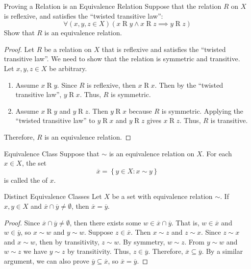 \documentclass[letterpaper,12pt]{report}
\begin{document}
\begin{exbox}{Proving a Relation is an Equivalence Relation}{}
    Suppose that the relation $R$ on $X$ is reflexive, and satisfies the ``twisted transitive law'':
    \[ \forall (x,y,z \in X) (x \mathrel{R} y \land x \mathrel{R} z \implies y \mathrel{R} z) \]
    Show that $R$ is an equivalence relation.
    \tcblower
    \begin{proof}
        Let $R$ be a relation on $X$ that is reflexive and satisfies the ``twisted transitive law''. We need to show that the relation is symmetric and transitive. Let $x,y,z \in X$ be arbitrary.
        \begin{enumerate}
            \item Assume $x \mathrel{R} y$. Since $R$ is reflexive, then $x \mathrel{R} x$. Then by the ``twisted transitive law'', $y \mathrel{R} x$. Thus, $R$ is symmetric.
            \item Assume $x \mathrel{R} y$ and $y \mathrel{R} z$. Then $y \mathrel{R} x$ because $R$ is symmetric. Applying the ``twisted transitive law'' to $y \mathrel{R} x$ and $y \mathrel{R} z$ gives $x \mathrel{R} z$. Thus, $R$ is transitive.
        \end{enumerate}
        Therefore, $R$ is an equivalence relation.
    \end{proof}
\end{exbox}

\begin{dfnbox}{Equivalence Class}{}
    Suppose that $\sim$ is an equivalence relation on $X$. For each $x \in X$, the set
    \[ \overline{x} = \left\{ y \in X : x \sim y \right\} \]
    is called the  of $x$.
\end{dfnbox}

\begin{thmbox}{Distinct Equivalence Classes}{}
    Let $X$ be a set with equivalence relation $\sim$. If $x,y \in X$ and $\overline{x} \cap \overline{y} \neq \emptyset$, then $\overline{x} = \overline{y}$.
    \tcblower
    \begin{proof}
        Since $\overline{x} \cap \overline{y} \neq \emptyset$, then there exists some $w \in \overline{x} \cap \overline{y}$. That is, $w \in \overline{x}$ and $w \in \overline{y}$, so $x \sim w$ and $y \sim w$. Suppose $z \in \overline{x}$. Then $x \sim z$ and $z \sim x$. Since $z \sim x$ and $x \sim w$, then by transitivity, $z \sim w$. By symmetry, $w \sim z$. From $y \sim w$ and $w \sim z$ we have $y \sim z$ by transitivity. Thus, $z \in \overline{y}$. Therefore, $\overline{x} \subseteq \overline{y}$. By a similar argument, we can also prove $\overline{y} \subseteq \overline{x}$, so $\overline{x} = \overline{y}$.
    \end{proof}
\end{thmbox}
\end{document}

